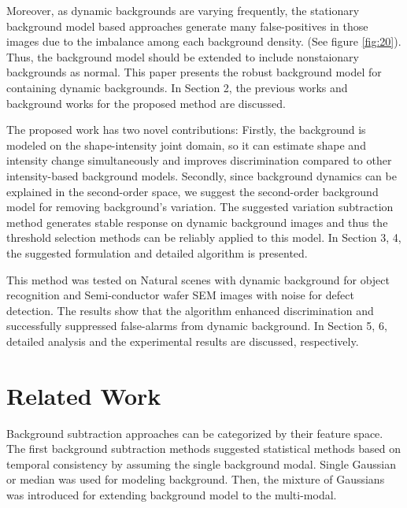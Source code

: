 \documentclass[conference]{IEEEtran}
\begin{document}
Moreover, as dynamic backgrounds are varying frequently, the stationary background model based approaches generate many false-positives in those images due to the imbalance among each background density. (See figure \ref{fig:20}). Thus, the background model should be extended to include nonstaionary backgrounds as normal. 
This paper presents the robust background model for containing dynamic backgrounds. In Section 2, the previous works and background works for the proposed method are discussed. 

The proposed work has two novel contributions: Firstly, the background is modeled on the shape-intensity joint domain, so it can estimate shape and intensity change simultaneously and improves discrimination compared to other intensity-based background models. Secondly, since background dynamics can be explained in the second-order space, we suggest the second-order background model for removing background’s variation. The suggested variation subtraction method generates stable response on dynamic background images and thus the threshold selection methods can be reliably applied to this model. In Section 3, 4, the suggested formulation and detailed algorithm is presented.

This method was tested on Natural scenes with dynamic background for object recognition and Semi-conductor wafer SEM images with noise for defect detection. The results show that the algorithm enhanced discrimination and successfully suppressed false-alarms from dynamic background. In Section 5, 6, detailed analysis and the experimental results are discussed, respectively.



\section{Related Work}

Background subtraction approaches can be categorized by their feature space. The first background subtraction methods \cite{Piccardi, Wren, Cucchiara} suggested statistical methods based on temporal consistency by assuming the single background modal. Single Gaussian \cite{Wren} or median \cite{Chucchiara} was used for modeling background. Then, the mixture of Gaussians \cite{Stauffer} was introduced for extending background model to the multi-modal. 
\end{document}
